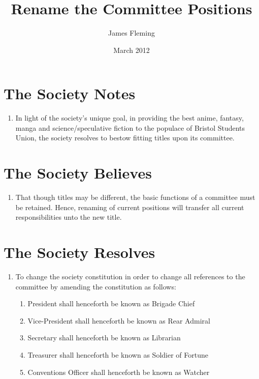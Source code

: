 \documentclass[a4paper,10pt]{article}
\title{Rename the Committee Positions}
\author{James Fleming}
\date{March 2012}
\begin{document}
\maketitle

\section*{The Society Notes}
\begin{enumerate}
  \item In light of the society’s unique goal, in providing the best anime, fantasy, manga and science/speculative fiction to the populace of Bristol Students Union, the society resolves to bestow fitting titles upon its committee.
\end{enumerate}

\section*{The Society Believes}
\begin{enumerate}
  \item That though titles may be different, the basic functions of a committee must be retained. Hence, renaming of current positions will transfer all current responsibilities unto the new title.
\end{enumerate}

\section*{The Society Resolves}
\begin{enumerate}
  \item To change the society constitution in order to change all references to the committee by amending the constitution as follows:
  \begin{enumerate}
    \item President shall henceforth be known as Brigade Chief
    \item Vice-President shall henceforth be known as Rear Admiral
    \item Secretary shall henceforth be known as Librarian
    \item Treasurer shall henceforth be known as Soldier of Fortune
    \item Conventions Officer shall henceforth be known as Watcher
  \end{enumerate}
\end{enumerate}
\end{document}

